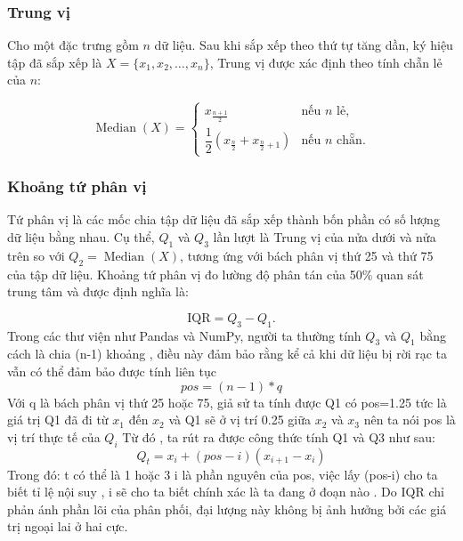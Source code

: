 \documentclass[12pt,a4paper]{article}
\begin{document}
\subsubsection*{Trung vị}

Cho một đặc trưng gồm $n$ dữ liệu. Sau khi sắp xếp theo thứ tự tăng
dần, ký hiệu tập đã sắp xếp là $X = \{x_1, x_2, \dots, x_n\}$,
Trung vị được xác định theo tính chẵn lẻ của $n$:

\begin{equation}
    \operatorname{Median}(X) =
    \begin{cases}
        x_{\frac{n+1}{2}} & \text{nếu } n \text{ lẻ,} \\[6pt]
        \dfrac{1}{2}\!\left(x_{\frac{n}{2}} + x_{\frac{n}{2}+1}\right)
        & \text{nếu } n \text{ chẵn.}
    \end{cases}
\end{equation}

\subsubsection*{Khoảng tứ phân vị}

Tứ phân vị là các mốc chia tập dữ liệu đã sắp xếp thành bốn phần
có số lượng dữ liệu bằng nhau. Cụ thể, $Q_1$ và $Q_3$ lần lượt là
Trung vị của nửa dưới và nửa trên so với $Q_2 = \operatorname{Median}(X)$,
tương ứng với bách phân vị thứ 25 và thứ 75 của tập dữ liệu.
Khoảng tứ phân vị đo lường độ phân tán của 50\% quan sát trung tâm
và được định nghĩa là:

\begin{equation}
    \text{IQR} = Q_3 - Q_1.
\end{equation}
Trong các thư viện như Pandas và NumPy, người ta thường tính $Q_3$ và $Q_1$ bằng cách là chia (n-1) khoảng , điều này đảm bảo rằng kể cả khi dữ liệu bị rời rạc ta vẫn có thể đảm bảo được tính liên tục   
\begin{equation}
    pos=(n-1)*q
\end{equation} 
Với q là bách phân vị thứ 25 hoặc 75, giả sử ta tính được Q1 có pos=1.25 tức là giá trị Q1 đã đi từ $x_1$ đến $x_2$ và Q1 sẽ ở vị trí 0.25 giữa $x_2$ và $x_3$ nên ta nói pos là vị trí thực tế của $Q_i$
\newline
Từ đó , ta rút ra được công thức tính Q1 và Q3 như sau:
\[
Q_t=x_i+(pos-i)(x_{i+1}-x_i)
\] 
Trong đó:
\newline
t có thể là 1 hoặc 3
\newline
i là phần nguyên của pos, việc lấy (pos-i) cho ta biết tỉ lệ nội suy , i sẽ cho ta biết chính xác là ta đang ở đoạn nào .  
\newline
Do IQR chỉ phản ánh phần lõi của phân phối, đại lượng này không bị
ảnh hưởng bởi các giá trị ngoại lai ở hai cực.
\end{document}
